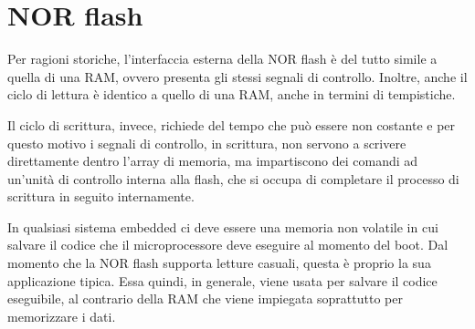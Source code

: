 \documentclass[11pt,4paper]{report}
\begin{document}
\section{NOR flash}
Per ragioni storiche, l'interfaccia esterna della NOR flash è del tutto simile a quella di una RAM, ovvero presenta gli stessi segnali di controllo. Inoltre, anche il ciclo di lettura è identico a quello di una RAM, anche in termini di tempistiche.

Il ciclo di scrittura, invece, richiede del tempo che può essere non costante e per questo motivo i segnali di controllo, in scrittura, non servono a scrivere direttamente dentro l'array di memoria, ma impartiscono dei comandi ad un'unità di controllo interna alla flash, che si occupa di completare il processo di scrittura in seguito internamente.

In qualsiasi sistema embedded ci deve essere una memoria non volatile in cui salvare il codice che il microprocessore deve eseguire al momento del boot. Dal momento che la NOR flash supporta letture casuali, questa è proprio la sua applicazione tipica. Essa quindi, in generale, viene usata per salvare il codice eseguibile, al contrario della RAM che viene impiegata soprattutto per memorizzare i dati.
\end{document}
